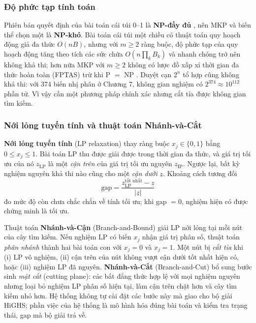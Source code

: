 \subsubsection*{Độ phức tạp tính toán}
Phiên bản quyết định của bài toán cái túi 0--1 là \textbf{NP-đầy đủ} \cite{gareyjohnson1979}, nên MKP và biến thể chọn một là \textbf{NP-khó}. Bài toán cái túi một chiều có thuật toán quy hoạch động giả đa thức $O(nB)$, nhưng với $m \ge 2$ ràng buộc, độ phức tạp của quy hoạch động tăng theo tích các sức chứa $O(n \prod_k B_k)$ và nhanh chóng trở nên không khả thi; hơn nữa MKP với $m \ge 2$ không có lược đồ xấp xỉ thời gian đa thức hoàn toàn (FPTAS) trừ khi P $=$ NP \cite{kellerer2004}. Duyệt cạn $2^n$ tổ hợp cũng không khả thi: với 374 biến nhị phân ở Chương 7, không gian nghiệm có $2^{374} \approx 10^{112}$ phần tử. Vì vậy cần một phương pháp chính xác nhưng cắt tỉa được không gian tìm kiếm.

\subsubsection*{Nới lỏng tuyến tính và thuật toán Nhánh-và-Cắt}
\textbf{Nới lỏng tuyến tính} (LP relaxation) thay ràng buộc $x_j \in \{0,1\}$ bằng $0 \le x_j \le 1$. Bài toán LP thu được giải được trong thời gian đa thức, và giá trị tối ưu của nó $z_{\text{LP}}$ là một \emph{cận trên} của giá trị tối ưu nguyên $z_{\text{IP}}$. Ngược lại, bất kỳ nghiệm nguyên khả thi nào cũng cho một \emph{cận dưới} $\underline{z}$. Khoảng cách tương đối
\begin{equation}
\text{gap} = \frac{z_{\text{LP}}^{\text{tốt nhất}} - \underline{z}}{|\underline{z}|}
\end{equation}
đo mức độ còn chưa chắc chắn về tính tối ưu; khi gap $= 0$, nghiệm hiện có được chứng minh là tối ưu.

Thuật toán \textbf{Nhánh-và-Cận} (Branch-and-Bound) \cite{wolsey1998} giải LP nới lỏng tại mỗi nút của cây tìm kiếm. Nếu nghiệm LP có biến $x_j$ nhận giá trị phân số, thuật toán \emph{phân nhánh} thành hai bài toán con với $x_j = 0$ và $x_j = 1$. Một nút bị \emph{cắt tỉa} khi (i) LP vô nghiệm, (ii) cận trên của nút không vượt cận dưới tốt nhất hiện có, hoặc (iii) nghiệm LP đã nguyên. \textbf{Nhánh-và-Cắt} (Branch-and-Cut) bổ sung bước sinh \emph{mặt cắt} (cutting plane): các bất đẳng thức hợp lệ với mọi nghiệm nguyên nhưng loại bỏ nghiệm LP phân số hiện tại, làm cận trên chặt hơn và cây tìm kiếm nhỏ hơn. Hệ thống không tự cài đặt các bước này mà giao cho bộ giải HiGHS; phần việc của hệ thống là mô hình hóa đúng bài toán và kiểm tra trạng thái, gap mà bộ giải trả về.

